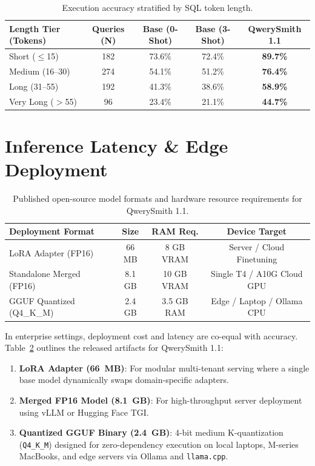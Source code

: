 \documentclass[10pt,twocolumn,letterpaper]{article}
\theoremstyle{definition}
\begin{document}
\begin{table}[t]
\centering\small
\begin{tabular}{lcccc}
\toprule
\textbf{Length Tier (Tokens)} & \textbf{Queries (N)} & \textbf{Base (0-Shot)} & \textbf{Base (3-Shot)} & \textbf{QwerySmith 1.1} \\
\midrule
Short ($\le$15) & 182 & 73.6\% & 72.4\% & \textbf{89.7\%} \\
Medium (16--30) & 274 & 54.1\% & 51.2\% & \textbf{76.4\%} \\
Long (31--55) & 192 & 41.3\% & 38.6\% & \textbf{58.9\%} \\
Very Long ($>$55) & 96 & 23.4\% & 21.1\% & \textbf{44.7\%} \\
\bottomrule
\end{tabular}
\caption{Execution accuracy stratified by SQL token length.}
\label{tab:length_stratification}
\end{table}

\section{Inference Latency \& Edge Deployment}
\label{sec:deployment}

\begin{table}[t]
\centering\small
\begin{tabular}{lccc}
\toprule
\textbf{Deployment Format} & \textbf{Size} & \textbf{RAM Req.} & \textbf{Device Target} \\
\midrule
LoRA Adapter (FP16) & 66 MB & 8 GB VRAM & Server / Cloud Finetuning \\
Standalone Merged (FP16) & 8.1 GB & 10 GB VRAM & Single T4 / A10G Cloud GPU \\
GGUF Quantized (Q4\_K\_M) & 2.4 GB & 3.5 GB RAM & Edge / Laptop / Ollama CPU \\
\bottomrule
\end{tabular}
\caption{Published open-source model formats and hardware resource requirements for QwerySmith 1.1.}
\label{tab:formats}
\end{table}

In enterprise settings, deployment cost and latency are co-equal with accuracy. Table~\ref{tab:formats} outlines the released artifacts for QwerySmith 1.1:
\begin{enumerate}
    \item \textbf{LoRA Adapter (66~MB)}: For modular multi-tenant serving where a single base model dynamically swaps domain-specific adapters.
    \item \textbf{Merged FP16 Model (8.1~GB)}: For high-throughput server deployment using vLLM or Hugging Face TGI.
    \item \textbf{Quantized GGUF Binary (2.4~GB)}: 4-bit medium K-quantization (\texttt{Q4\_K\_M}) designed for zero-dependency execution on local laptops, M-series MacBooks, and edge servers via Ollama and \texttt{llama.cpp}.
\end{enumerate}
\end{document}
